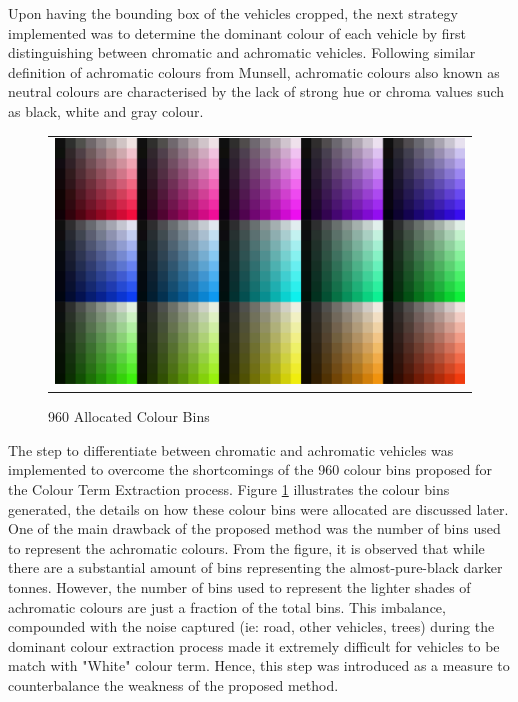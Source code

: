 Upon having the bounding box of the vehicles cropped, the next strategy implemented was to determine the dominant colour of each vehicle by first distinguishing between chromatic and achromatic vehicles. Following similar definition of achromatic colours from Munsell, achromatic colours also known as neutral colours are characterised by the lack of strong hue or chroma values such as black, white and gray colour.

\begin{figure}[htb!]
  \centering
\begin{tabular}{c}
 \includegraphics[width=0.7\linewidth]{image/retrievalOne/all.png} \\  
\end{tabular}
\caption{960 Allocated Colour Bins} \label{fig:hsvAllocated}
\end{figure}

The step to differentiate between chromatic and achromatic vehicles was implemented to overcome the shortcomings of the 960 colour bins proposed for the Colour Term Extraction process. Figure \ref{fig:hsvAllocated} illustrates the colour bins generated, the details on how these colour bins were allocated are discussed later. One of the main drawback of the proposed method was the number of bins used to represent the achromatic colours. From the figure, it is observed that while there are a substantial amount of bins representing the almost-pure-black darker tonnes. However, the number of bins used to represent the lighter shades of achromatic colours are just a fraction of the total bins. 
This imbalance, compounded with the noise captured (ie: road, other vehicles, trees) during the dominant colour extraction process made it extremely difficult for vehicles to be match with "White" colour term. Hence, this step was introduced as a measure to counterbalance the weakness of the proposed method. 


